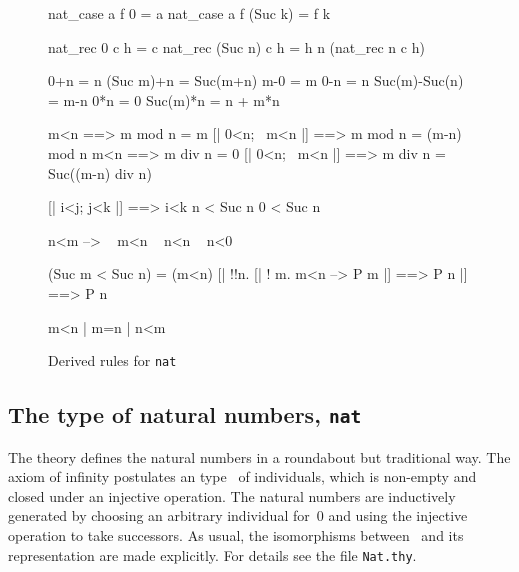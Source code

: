 \begin{figure}
\begin{ttbox}\makeatother
{}     nat_case a f 0 = a
   nat_case a f (Suc k) = f k

      nat_rec 0 c h = c
    nat_rec (Suc n) c h = h n (nat_rec n c h)

        0+n           = n
      (Suc m)+n     = Suc(m+n)
       m-0           = m
  0-n           = n
 Suc(m)-Suc(n) = m-n
     0*n           = 0
     Suc(m)*n      = n + m*n

     m<n ==> m mod n = m
      [| 0<n;  ~m<n |] ==> m mod n = (m-n) mod n
     m<n ==> m div n = 0
      [| 0<n;  ~m<n |] ==> m div n = Suc((m-n) div n)

     [| i<j;  j<k |] ==> i<k
          n < Suc n
  0 < Suc n

   n<m --> ~ m<n 
  ~ n<n
      ~ n<0

    (Suc m < Suc n) = (m<n)
    [| !!n. [| ! m. m<n --> P m |] ==> P n |]  ==>  P n

    m<n | m=n | n<m
\end{ttbox}
\caption{Derived rules for {\tt nat}} \label{hol-nat2}
\end{figure}

\subsection{The type of natural numbers, {\tt nat}}

The theory  defines the natural numbers in a roundabout but
traditional way.  The axiom of infinity postulates an type~ of
individuals, which is non-empty and closed under an injective operation.
The natural numbers are inductively generated by choosing an arbitrary
individual for~0 and using the injective operation to take successors.  As
usual, the isomorphisms between~ and its representation are made
explicitly. For details see the file {\tt Nat.thy}.


